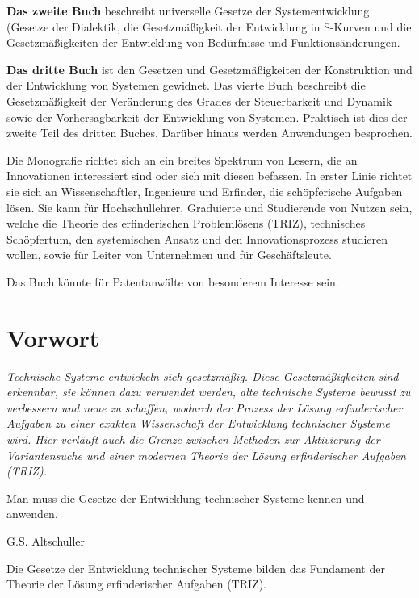 \documentclass[11pt,a4paper]{article}
\begin{document}
\textbf{Das zweite Buch} beschreibt universelle Gesetze der Systementwicklung
(Gesetze der Dialektik, die Gesetzmäßigkeit der Entwicklung in S-Kurven und
die Gesetzmäßigkeiten der Entwicklung von Bedürfnisse und Funktionsänderungen.

\textbf{Das dritte Buch} ist den Gesetzen und Gesetzmäßigkeiten der
Konstruktion und der Entwicklung von Systemen gewidnet.  Das vierte Buch
beschreibt die Gesetzmäßigkeit der Verän\-derung des Grades der Steuerbarkeit
und Dynamik sowie der Vorhersagbarkeit der Entwicklung von Systemen. Praktisch
ist dies der zweite Teil des dritten Buches. Darüber hinaus werden Anwendungen
besprochen.

Die Monografie richtet sich an ein breites Spektrum von Lesern, die an
Innovationen interessiert sind oder sich mit diesen befassen. In erster Linie
richtet sie sich an Wissenschaftler, Ingenieure und Erfinder, die
schöpferische Aufgaben lösen. Sie kann für Hochschullehrer, Graduierte und
Studierende von Nutzen sein, welche die Theorie des erfinderischen
Problemlösens (TRIZ), technisches Schöpfertum, den systemischen Ansatz und den
Innovationsprozess studieren wollen, sowie für Leiter von Unternehmen und für
Geschäftsleute.

Das Buch könnte für Patentanwälte von besonderem Interesse sein.

\section*{Vorwort}

\begin{flushright}
  \begin{minipage}{.75\textwidth}\it
    Technische Systeme entwickeln sich gesetzmäßig. Diese
    Gesetz\-mäßig\-keiten sind erkennbar, sie können dazu verwendet werden,
    alte technische Systeme bewusst zu verbessern und neue zu schaffen,
    wodurch der Prozess der Lösung erfinderischer Aufgaben zu einer exakten
    Wissenschaft der Entwicklung technischer Systeme wird. Hier verläuft auch
    die Grenze zwischen Methoden zur Aktivierung der Variantensuche und einer
    modernen Theorie der Lösung erfinderischer Aufgaben (TRIZ).

    Man muss die Gesetze der Entwicklung technischer Systeme kennen und
    anwenden.
    \begin{flushright}
      G.S. Altschuller
    \end{flushright}
  \end{minipage}
\end{flushright}
Die Gesetze der Entwicklung technischer Systeme bilden das Fundament der
Theorie der Lösung erfinderischer Aufgaben (TRIZ).
\end{document}
